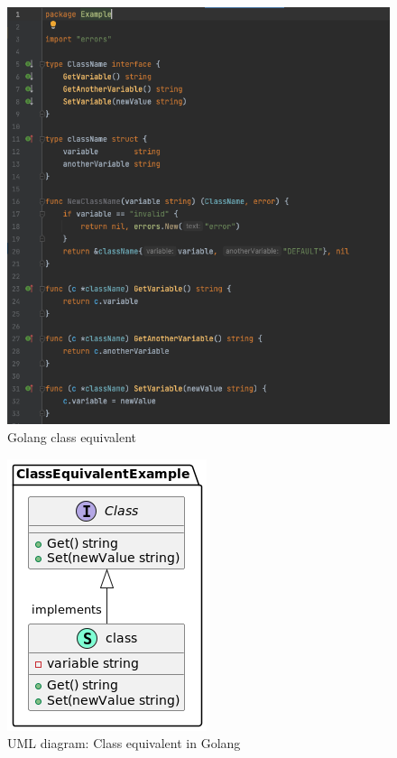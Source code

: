 \begin{figure}[H]
    \centering
    \includegraphics[height=0.5\textheight]{./part/Ejecucion/Seguimiento/classExample}
    \caption{Golang class equivalent}\label{fig:golang class equivalent}
\end{figure}

\begin{figure}[H]
    \centering
    \includegraphics[height=0.25\textheight]{./part/Proyecto_ejecutivo/memoria_constructiva/ClassEquivalentInGolang}
    \caption{UML diagram: Class equivalent in Golang}\label{fig: uml Diagram Class Equivalent in Golang}
\end{figure}

